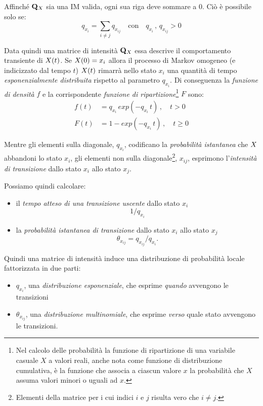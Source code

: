 Affinché $\mathbf{Q}_{\mathnormal{X}}$ sia una \acl{IM} valida, ogni sua riga deve sommare a $0$. Ciò è possibile solo se:
\[
q_{x_i}=\sum_{i \neq j}q_{x_{ij}}\quad\text{con}\quad q_{x_i}\,,\,q_{x_{ij}}>0
\]

Data quindi una matrice di intensità $\mathbf{Q}_{\mathnormal{X}}$ essa descrive il comportamento transiente di $\mathnormal{X}(t)$. Se $\mathnormal{X}(0)=x_i$ allora il processo di Markov omogeneo (e indicizzato dal tempo $t$) $\mathnormal{X}(t)$ rimarrà nello stato $x_i$ una quantità di tempo \emph{esponenzialmente distribuita} rispetto al parametro $q_{x_i}$. Di conseguenza la \emph{funzione di densità} $f$ e la corrispondente \emph{funzione di ripartizione}\footnote{Nel calcolo delle probabilità la funzione di ripartizione di una variabile casuale $X$ a valori reali, anche nota come funzione di distribuzione cumulativa, è la funzione che associa a ciascun valore $x$ la probabilità che $X$ assuma valori minori o uguali ad $x$.} $F$ sono:
\begin{equation}
\label{eq:im-distrib}
\begin{split}
f(t) &= q_{x_i}\,exp(-q_{x_i}\,t)\,,\quad t>0 \\
F(t) &= 1-exp(-q_{x_i}\,t)\,,\quad t\geq0
\end{split} 
\end{equation}

Mentre gli elementi sulla diagonale, $q_{x_i}$, codificano la \emph{probabilità istantanea} che $\mathnormal{X}$ abbandoni lo stato $x_i$, gli elementi non sulla diagonale\footnote{Elementi della matrice per i cui indici $i$ e $j$ risulta vero che $i \neq j$.}, $x_{ij}$, esprimono l'\emph{intensità di transizione} dallo stato $x_i$ allo stato $x_j$. 

Possiamo quindi calcolare:
\begin{itemize}
    \item il \emph{tempo atteso di una transizione uscente} dallo stato $x_i$ \[1/q_{x_i}\]
    \item la \emph{probabilità istantanea di transizione} dallo stato $x_i$ allo stato $x_j$ \[\theta_{x_{ij}}=q_{x_{ij}}/q_{x_i}\text{.}\]
\end{itemize}
Quindi una matrice di intensità induce una distribuzione di probabilità locale fattorizzata in due parti:
\begin{itemize}
    \item $q_{x_i}$, una \emph{distribuzione esponenziale}, che esprime \emph{quando} avvengono le transizioni
    \item $\theta_{x_{ij}}$, una \emph{distribuzione multinomiale}, che esprime \emph{verso} quale stato avvengono le transizioni.
\end{itemize}

